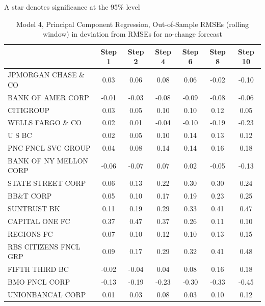 \documentclass[11pt]{article}
\begin{document}
\begin{table}
\flushleft
\footnotesize \noindent A star denotes significance at the 95\% level                                                      
                                                       
\end{table}                                                         




\begin{table} 
\caption{Model 4, Principal Component Regression, Out-of-Sample RMSEs (rolling window) in deviation from RMSEs for no-change forecast}                                                  
\center                                                     
\begin{tabular}{|l|c|c|c|c|c|c|}                            
\hline                                                      
&Step 1 &Step 2 &Step 4 &Step 6 &Step 8 &Step 10\\          
\hline                                                      
JPMORGAN CHASE \& CO  &0.03&0.06&0.08&0.06&-0.02&-0.10\\    
BANK OF AMER CORP     &-0.01&-0.03&-0.08&-0.09&-0.08&-0.06\\
CITIGROUP             &0.03&0.05&0.10&0.10&0.12&0.05\\      
WELLS FARGO \& CO     &0.02&0.01&-0.04&-0.10&-0.19&-0.23\\  
U S BC                &0.02&0.05&0.10&0.14&0.13&0.12\\      
PNC FNCL SVC GROUP    &0.04&0.08&0.14&0.14&0.16&0.18\\      
BANK OF NY MELLON CORP&-0.06&-0.07&0.07&0.02&-0.05&-0.13\\  
STATE STREET CORP     &0.06&0.13&0.22&0.30&0.30&0.24\\      
BB\&T CORP            &0.05&0.10&0.17&0.19&0.23&0.25\\      
SUNTRUST BK           &0.11&0.19&0.29&0.33&0.41&0.47\\      
CAPITAL ONE FC        &0.37&0.47&0.37&0.26&0.11&0.10\\      
REGIONS FC            &0.07&0.10&0.12&0.10&0.13&0.15\\      
RBS CITIZENS FNCL GRP &0.09&0.17&0.29&0.32&0.41&0.48\\      
FIFTH THIRD BC        &-0.02&-0.04&0.04&0.08&0.16&0.18\\    
BMO FNCL CORP         &-0.13&-0.19&-0.23&-0.30&-0.33&-0.45\\
UNIONBANCAL CORP      &0.01&0.03&0.08&0.03&0.10&0.12\\      

\end{tabular}
\end{table}
\end{document}
